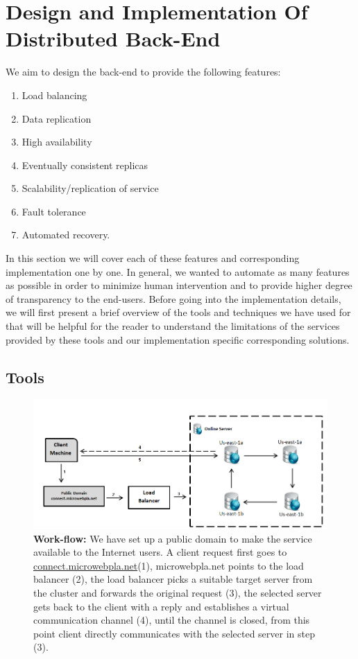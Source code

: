 \documentclass[12pt]{article}
\begin{document}
\section {Design and Implementation Of Distributed Back-End} 
We aim to design the back-end to provide the following features:
\begin{enumerate}
\item Load balancing
\item Data replication
\item High availability
\item Eventually consistent replicas
\item Scalability/replication of service
\item Fault tolerance
\item Automated recovery. 
\end{enumerate}
In this section we will cover each of these features and corresponding implementation 
one by one. In general, we wanted to automate as many features as possible in order to 
minimize human intervention and to provide higher degree of 
transparency to the end-users. Before going into the implementation details, we will first
present a brief overview of the tools and techniques we have used for that will
be helpful for the reader to understand the limitations of the services provided
by these tools and our implementation specific corresponding solutions.

\subsection{Tools} 

\begin{figure}[H] 
\centering
\includegraphics[scale=0.60]{Images/figure1.PNG} 
\caption{\textbf{Work-flow: }We
have set up a public domain to make the service available to the Internet users.
A client request first goes to \url{connect.microwebpla.net}(1), microwebpla.net points
to the load balancer (2), the load balancer picks a suitable target server from
the cluster and forwards the original request (3), the selected server gets back
to the client with a reply and establishes a virtual communication channel (4),
until the channel is closed, from this point client directly communicates with
the selected server in step (3).} 
\label{fig:workflow} 
\end{figure} 
\end{document}
